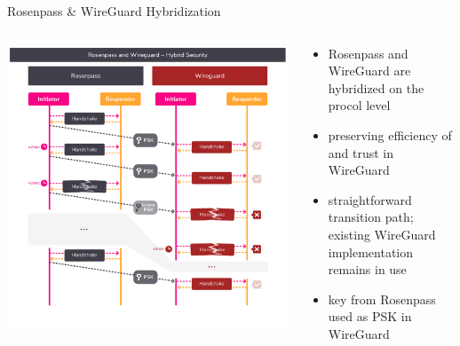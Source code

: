 \begin{frame}{Rosenpass \& WireGuard Hybridization}
  \begin{columns}[c]

    \begin{column}{.6\linewidth}
      \includegraphics[height=\textheight, clip=true,trim=0cm .5cm 0cm 3.2cm,padding=-1cm 0cm 0cm 0cm]{graphics/rosenpass-wireguard-hybrid-security.pdf}
    \end{column}

    \begin{column}{.4\linewidth}
      \small
      \begin{itemize}
        \item Rosenpass and WireGuard are hybridized on the procol level
        \item preserving efficiency of and trust in WireGuard
        \item straightforward transition path; existing WireGuard implementation remains in use
        \item key from Rosenpass used as PSK in WireGuard
      \end{itemize}
    \end{column}

  \end{columns}
\end{frame}
